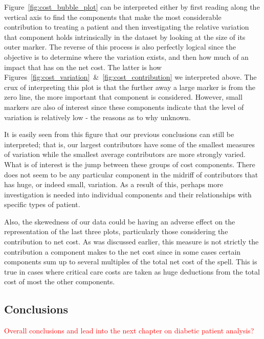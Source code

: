 Figure~\ref{fig:cost_bubble_plot} can be interpreted either by first reading
along the vertical axis to find the components that make the most considerable
contribution to treating a patient and then investigating the relative variation
that component holds intrinsically in the dataset by looking at the size of its
outer marker. The reverse of this process is also perfectly logical since the
objective is to determine where the variation exists, and then how much of an
impact that has on the net cost. The latter is how
Figures~\ref{fig:cost_variation}~\&~\ref{fig:cost_contribution} we interpreted
above. The crux of interpreting this plot is that the further away a large
marker is from the zero line, the more important that component is considered.
However, small markers are also of interest since these components indicate that
the level of variation is relatively low \-- the reasons as to why unknown.

It is easily seen from this figure that our previous conclusions can still be
interpreted; that is, our largest contributors have some of the smallest
measures of variation while the smallest average contributors are more strongly
varied. What is of interest is the jump between these groups of cost components.
There does not seem to be any particular component in the midriff of
contributors that has huge, or indeed small, variation. As a result of this,
perhaps more investigation is needed into individual components and their
relationships with specific types of patient.

Also, the skewedness of our data could be having an adverse effect on the
representation of the last three plots, particularly those considering the
contribution to net cost. As was discussed earlier, this measure is not strictly
the contribution a component makes to the net cost since in some cases certain
components sum up to several multiples of the total net cost of the spell. This
is true in cases where critical care costs are taken as huge deductions from the
total cost of most the other components.

\subsection{Conclusions}

\textcolor{red}{%
    Overall conclusions and lead into the next chapter on diabetic patient
    analysis?
}